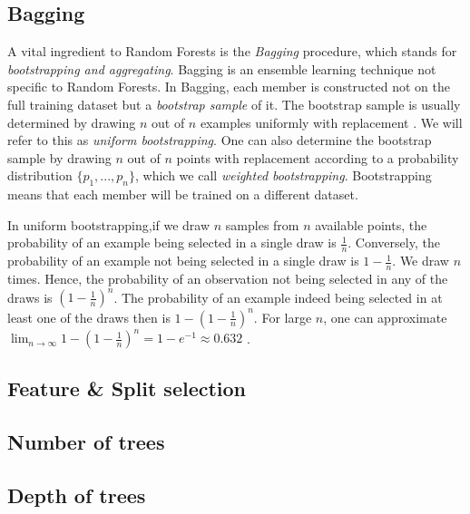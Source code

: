 \documentclass[../main.tex]{subfiles}
\begin{document}



\subsection{Bagging}
\label{sec:bagging}

A vital ingredient to Random Forests is the \textit{Bagging} procedure, which stands for \textit{bootstrapping and aggregating}. Bagging is an ensemble learning technique not specific to Random Forests. In Bagging, each member is constructed not on the full training dataset but a \textit{bootstrap sample} of it. The bootstrap sample is usually determined by drawing $n$ out of $n$ examples uniformly with replacement \cite{breiman,others}. We will refer to this as \textit{uniform bootstrapping}. One can also determine the bootstrap sample by drawing $n$ out of $n$ points with replacement according to a probability distribution $\{p_1, ..., p_n\}$, which we call \textit{weighted bootstrapping}. Bootstrapping means that each member will be trained on a different dataset. 

In uniform bootstrapping,if we draw $n$ samples from $n$ available points, the probability of an example being selected in a single draw is $\frac{1}{n}$. Conversely, the probability of an example not being selected in a single draw is $1-\frac{1}{n}$. We draw $n$ times. Hence, the probability of an observation not being selected in any of the draws is $(1-\frac{1}{n})^n$. The probability of an example indeed being selected in at least one of the draws then is $1 - (1 - \frac{1}{n})^n$.  For large $n$, one can approximate $\lim_{ n \to \infty }1-(1-\frac{1}{n})^n = 1- e^{-1} \approx 0.632$ \cite{todo}.


\subsection{Feature \& Split selection}


\subsection{Number of trees}

\subsection{Depth of trees}
\end{document}
